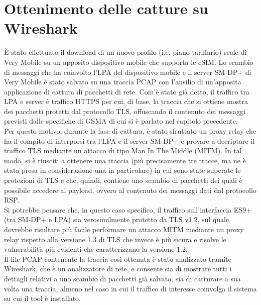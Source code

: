 \documentclass[10pt, oneside]{book}
\begin{document}
\section{Ottenimento delle catture su Wireshark}
È stato effettuato il download di un nuovo profilo (i.e. piano tariffario) reale di Very Mobile su un apposito dispositivo mobile che supporta le eSIM. Lo scambio di messaggi che ha coinvolto l'LPA del dispositivo mobile e il server SM-DP+ di Very Mobile è stato salvato su una traccia PCAP con l'ausilio di un'apposita applicazione di cattura di pacchetti di rete. Com'è stato già detto, il traffico tra LPA e server è traffico HTTPS per cui, di base, la traccia che si ottiene mostra dei pacchetti protetti dal protocollo TLS, offuscando il contenuto dei messaggi previsti dalle specifiche di GSMA di cui si è parlato nel capitolo precedente.\\
Per questo motivo, durante la fase di cattura, è stato sfruttato un proxy relay che ha il compito di interporsi tra l'LPA e il server SM-DP+ e provare a decriptare il traffico TLS mediante un attacco di tipo Man In The Middle (MITM). In tal modo, si è riusciti a ottenere una traccia (più precisamente tre tracce, ma ne è stata presa in considerazione una in particolare) in cui sono state superate le protezioni di TLS e che, quindi, contiene uno scambio di pacchetti dei quali è possibile accedere al payload, ovvero al contenuto dei messaggi dati dal protocollo RSP.\\
Si potrebbe pensare che, in questo caso specifico, il traffico sull'interfaccia ES9+ (tra SM-DP+ e LPA) sia verosimilmente protetto da TLS v1.2, sul quale dovrebbe risultare più facile performare un attacco MITM mediante un proxy relay rispetto alla versione 1.3 di TLS che invece è più sicura e risolve le vulnerabilità più evidenti che caratterizzano la versione 1.2.\\
Il file PCAP contenente la traccia così ottenuta è stato analizzato tramite Wireshark, che è un analizzatore di rete, e consente sia di mostrare tutti i dettagli relativi a uno scambio di pacchetti già salvato, sia di catturare a sua volta una traccia, almeno nel caso in cui il traffico di interesse coinvolga il sistema su cui il tool è installato.
\end{document}

